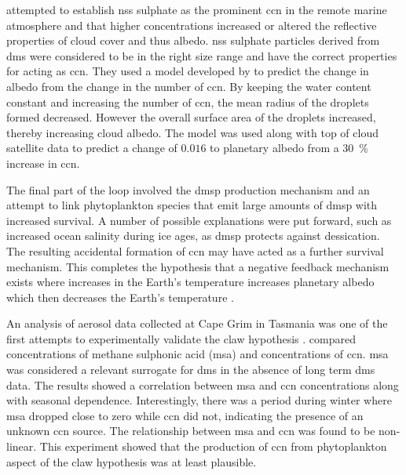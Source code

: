 		\citet{charlson:1987fw} attempted to establish \gls{nss} sulphate as the prominent \gls{ccn} in the remote marine atmosphere and that higher concentrations increased or altered the reflective properties of cloud cover and thus albedo. \gls{nss} sulphate particles derived from \gls{dms} were considered to be in the right size range and have the correct properties for acting as \gls{ccn}. They used a model developed by \citet{twomey:1977} to predict the change in albedo from the change in the number of \gls{ccn}. By keeping the water content constant and increasing the number of \gls{ccn}, the mean radius of the droplets formed decreased. However the overall surface area of the droplets increased, thereby increasing cloud albedo. The model was used along with top of cloud satellite data to predict a change of $0.016$ to planetary albedo from a \SI{30}{\percent} increase in \gls{ccn}.

		The final part of the loop involved the \gls{dmsp} production mechanism and an attempt to link phytoplankton species that emit large amounts of \gls{dmsp} with increased survival. A number of possible explanations were put forward, such as increased ocean salinity during ice ages, as \gls{dmsp} protects against dessication. The resulting accidental formation of \gls{ccn} may have acted as a further survival mechanism. This completes the hypothesis that a negative feedback mechanism exists where increases in the Earth's temperature increases planetary albedo which then decreases the Earth's temperature \citep{charlson:1987fw}.


		An analysis of aerosol data collected at Cape Grim in Tasmania was one of the first attempts to experimentally validate the \gls{claw} hypothesis \citep{ayers:1991gd}. \citet{ayers:1991gd} compared concentrations of methane sulphonic acid (\gls{msa}) and concentrations of \gls{ccn}. \gls{msa} was considered a relevant surrogate for \gls{dms} in the absence of long term \gls{dms} data. The results showed a correlation between \gls{msa} and \gls{ccn} concentrations along with seasonal dependence. Interestingly, there was a period during winter where \gls{msa} dropped close to zero while \gls{ccn} did not, indicating the presence of an unknown \gls{ccn} source. The relationship between \gls{msa} and \gls{ccn} was found to be non-linear. This experiment showed that the production of \gls{ccn} from phytoplankton aspect of the \gls{claw} hypothesis was at least plausible.


